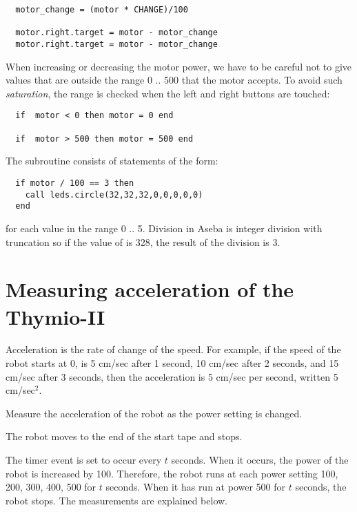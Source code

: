 \begin{verbatim}
  motor_change = (motor * CHANGE)/100

  motor.right.target = motor - motor_change
  motor.right.target = motor - motor_change
\end{verbatim}

When increasing or decreasing the motor power, we have to be careful not
to give values that are outside the range 0 .. 500 that the motor
accepts. To avoid such \emph{saturation}, the range is checked when the
left and right buttons are touched:

\begin{verbatim}
  if  motor < 0 then motor = 0 end

  if  motor > 500 then motor = 500 end
\end{verbatim}

The subroutine  consists of statements of the form:

\begin{verbatim}
  if motor / 100 == 3 then
    call leds.circle(32,32,32,0,0,0,0,0)
  end
\end{verbatim}
for each value in the range 0 .. 5. Division in Aseba is integer
division with truncation so if the value of  is 328, the result
of the division is 3.

\section{Measuring acceleration of the Thymio-II}

Acceleration is the rate of change of the speed. For example, if the
speed of the robot starts at 0, is 5 cm/sec after 1 second, 10 cm/sec
after 2 seconds, and 15 cm/sec after 3 seconds, then the acceleration is
5 cm/sec per second, written 5 cm/sec$^2$.


Measure the acceleration of the robot as the power setting is changed.


The robot moves to the end of the start tape and stops.

The timer event  is set to occur every $t$ seconds. When it
occurs, the power of the robot is increased by 100. Therefore, the robot
runs at each power setting 100, 200, 300, 400, 500 for $t$ seconds. When
it has run at power 500 for $t$ seconds, the robot stops. The
measurements are explained below.

